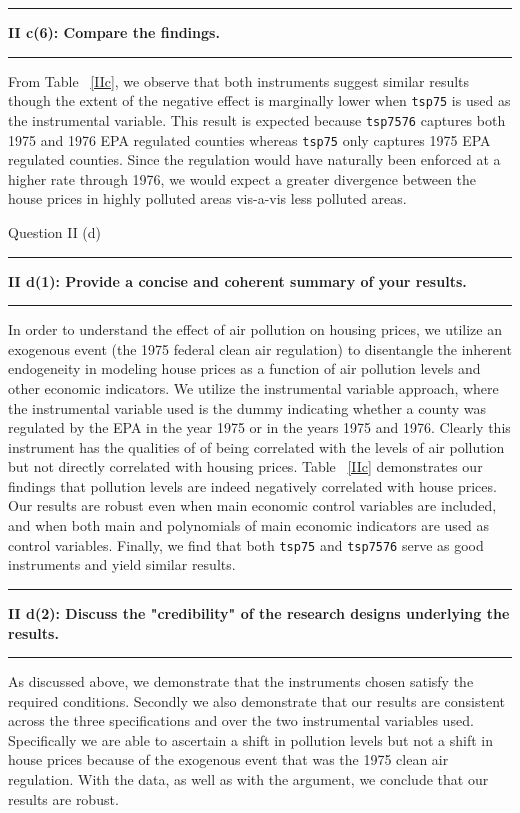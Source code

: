 \documentclass[12pt]{article}
\newcommand\question[2]{\vspace{1em}\hrule\vspace{1em}\textbf{#1: #2}\vspace{1em}\hrule\vspace{1em}}
\begin{document}
\question{II c(6)}{Compare the findings. }
From Table ~\ref{IIc}, we observe that both instruments suggest similar results though the extent of the negative effect is marginally lower when \verb|tsp75| is used as the instrumental variable. This result is expected because \verb|tsp7576| captures both 1975 and 1976 EPA regulated counties whereas \verb|tsp75| only captures 1975 EPA regulated counties. Since the regulation would have naturally been enforced at a higher rate through 1976, we would expect a greater divergence between the house prices in highly polluted areas vis-a-vis less polluted areas.


\begin{center}\LARGE{Question II (d)}\end{center}
\question{II d(1)}{Provide a concise and coherent summary of your results.  }
In order to understand the effect of air pollution on housing prices, we utilize an exogenous event (the 1975 federal clean air regulation) to disentangle the inherent endogeneity in modeling house prices as a function of air pollution levels and other economic indicators. We utilize the instrumental variable approach, where the instrumental variable used is the dummy indicating whether a county was regulated by the EPA in the year 1975 or in the years 1975 and 1976. Clearly this instrument has the qualities of of being correlated with the levels of air pollution but not directly correlated with housing prices. Table ~\ref{IIc} demonstrates our findings that pollution levels are indeed negatively correlated with house prices. Our results are robust even when main economic control variables are included, and when both main and polynomials of main economic indicators are used as control variables. Finally, we find that both \verb|tsp75| and \verb|tsp7576| serve as good instruments and yield similar results.

\question{II d(2)}{Discuss the "credibility" of the research designs underlying the results. }
As discussed above, we demonstrate that the instruments chosen satisfy the required conditions. Secondly we also demonstrate that our results are consistent across the three specifications and over the two instrumental variables used. Specifically we are able to ascertain a shift in pollution levels but not a shift in house prices because of the exogenous event that was the 1975 clean air regulation. With the data, as well as with the argument, we conclude that our results are robust.

 

\end{document}
